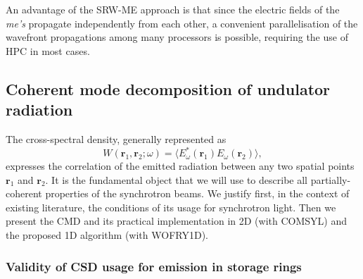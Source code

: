 \documentclass[preprint]{iucr}
\begin{document}
An advantage of the SRW-ME approach is that since the electric fields of the \textit{me's} propagate independently from each other, a convenient parallelisation of the wavefront propagations among many processors is possible, requiring the use of HPC in most cases.
\subsection{Coherent mode decomposition of undulator radiation}\label{sec:CMD}

The cross-spectral density, generally represented as
\begin{equation}
W(\textbf{r}_1,\textbf{r}_2;\omega) = \big\langle E^*_{\omega}(\textbf{r}_1)  E_{\omega}(\textbf{r}_2)\big\rangle,
\label{eq:CSD_2D}
\end{equation}
expresses the correlation of the emitted radiation between any two spatial points $\textbf{r}_1$ and $\textbf{r}_2$. It is the fundamental object that we will use to describe all partially-coherent properties of the synchrotron beams. We justify first, in the context of existing literature, the conditions of its usage for synchrotron light. Then we present the CMD and its practical implementation in 2D (with COMSYL) and the proposed 1D algorithm (with WOFRY1D).


\subsubsection{Validity of CSD usage for emission in storage rings\\}\label{sec:validity}
\end{document}
